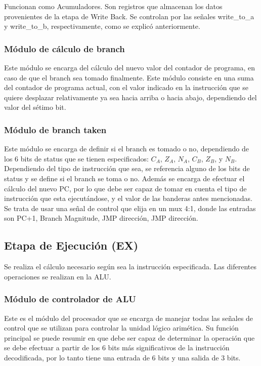 Funcionan como Acumuladores. Son registros que almacenan los datos provenientes de la etapa de Write Back. Se controlan por las señales write\_to\_a y write\_to\_b, respectivamente, como se explicó anteriormente.


\subsubsection{Módulo de cálculo de branch}

Este módulo se encarga del cálculo del nuevo valor del contador de programa, en caso de que el branch sea tomado finalmente. Este módulo consiste en una suma del contador de programa actual, con el valor indicado en la instrucción que se quiere desplazar relativamente ya sea hacia arriba o hacia abajo, dependiendo del valor del sétimo bit.

\subsubsection{Módulo de branch taken}

Este módulo se encarga de definir si el branch es tomado o no, dependiendo de los 6 bits de status que se tienen especificados: $C_A$, $Z_A$, $N_A$, $C_B$, $Z_B$, y $N_B$. Dependiendo del tipo de instrucción que sea, se referencia alguno de los bits de status y se define si el branch se toma o no.
Adem\' as se encarga de efectuar el c\' alculo del nuevo PC, por lo que debe ser capaz de tomar en cuenta el tipo de instrucci\' on que esta ejecut\' andose, y el valor de las banderas antes mencionadas. Se trata de usar una se\~ nal de control que elija en un mux 4:1, donde las entradas son PC+1, Branch Magnitude, JMP direcci\' on, JMP direcci\' on.


\subsection{Etapa de Ejecución (EX)}

Se realiza el cálculo necesario según sea la instrucción especificada. Las diferentes operaciones se realizan en la ALU.

\subsubsection{M\' odulo de controlador de ALU}
Este es el m\' odulo del procesador que se encarga de manejar todas las se\~ nales de control que se utilizan para controlar la unidad l\' ogico arim\' etica. Su funci\' on principal se puede resumir en que debe ser capaz de determinar la operaci\' on que se debe efectuar a partir de los 6 bits m\' as significativos de la instrucci\' on decodificada, por lo tanto tiene una entrada de 6 bits y una salida de 3 bits.


